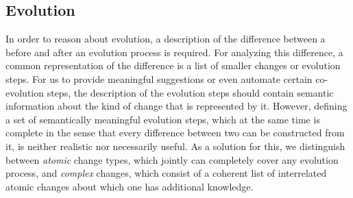 \begin{comment}
The expected behavior of the model query operators in~\cref{fig:model-query-operators} is as follows.
The \texttt{select} operator selects \metamodel elements, which will appear in the view type, while the \texttt{filter} operator is used to define criteria by which model instances are included in a view when generating it.
\MA{So, if I understand correctly, a "select" is a "filter" with no filtering criterium?}
\LK{Not directly. Comparing it to databases, the "select" operator would create the column headers, i.e. specify what kind of data will be presented, while the "filter" operator would define (e.g., by defining a predicate function) which rows from the database will be included in the result. Is this understandable from what I wrote or do you have an idea how I could improve the explanation?}
For the multi-\metamodel case, the \texttt{join} operator connects model instances from different \metamodels.
Both, the \texttt{aggregate} and the \texttt{calculate} operator create new model elements.
While the former combines the values of a single property in multiple instances of a \metaclass, the latter is used to calculate a new property based on multiple existing ones.
Following \textcite{burger_model-join_2016}, we assume this is a reasonable set of operators for the definition of generic views.
\end{comment}

\subsection{\Metamodel Evolution}
\label{sec:MetaModelEvolution}

In order to reason about \metamodel evolution, a description of the difference between a \metamodel before and after an evolution process is required.
For analyzing this difference, a common representation of the difference is a list of smaller changes or evolution steps.
For us to provide meaningful suggestions or even automate certain co-evolution steps, the description of the evolution steps should contain semantic information about the kind of change that is represented by it.
However, defining a set of semantically meaningful evolution steps, which at the same time is complete in the sense that every difference between two \metamodels can be constructed from it, is neither realistic nor necessarily useful.
As a solution for this, we distinguish between \emph{atomic} \metamodel change types, which jointly can completely cover any evolution process, and \emph{complex} changes, which consist of a coherent list of interrelated atomic changes about which one has additional knowledge.%

